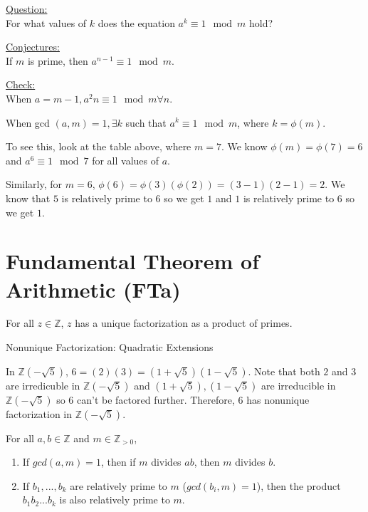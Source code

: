 \underline{Question:}\\
For what values of $k$ does the equation $a^k \equiv 1 \mod m$ hold?
\item
\underline{Conjectures:}\\
If $m$ is prime, then $a^{n-1} \equiv 1 \mod m$.
\item
\underline{Check:}\\
When $a=m-1, a^2n \equiv 1 \mod m \forall n$.
\item When gcd $(a, m) =1, \exists k$ such that $a^k \equiv 1 \mod m$, where $k= \phi (m)$. 
\item To see this, look at the table above, where $m=7$. We know $\phi (m)= \phi (7)=6$ and $a^6 \equiv 1 \mod 7$ for all values of $a$.
\item Similarly, for $m=6$, $\phi (6) = \phi (3)(\phi (2)) = (3-1)(2-1)=2$.
We know that $5$ is relatively prime to $6$ so we get $1$ and $1$ is relatively prime to $6$ so we get $1$.



\section{Fundamental Theorem of Arithmetic (FTa)}

For all $z \in \mathbb{Z}$, $z$ has a unique factorization as a product of primes.

\begin{example} Nonunique Factorization: Quadratic Extensions

In $\mathbb{Z}(-\sqrt{5})$, $6 = (2)(3) = (1 + \sqrt{5})(1 - \sqrt{5})$.
Note that both $2$ and $3$ are irredicuble in $\mathbb{Z}(-\sqrt{5})$ and $(1 + \sqrt{5}),(1 - \sqrt{5})$ are irreducible in $\mathbb{Z}(-\sqrt{5})$ so $6$ can't be factored further. Therefore, $6$ has nonunique factorization in $\mathbb{Z}(-\sqrt{5})$.
\end{example}

\begin{lemma} For all $a,b \in \mathbb{Z}$ and $m \in \mathbb{Z}_{>0}$,
\begin{enumerate}
\item If $gcd(a,m) = 1$, then if $m$ divides $ab$, then $m$ divides $b$. 
 \item If $b_1,...,b_k$ are relatively prime to $m$ ($gcd(b_i,m) = 1$), then the product $b_1b_2...b_k$ is also relatively prime to $m$.
\end{enumerate}
\end{lemma}

